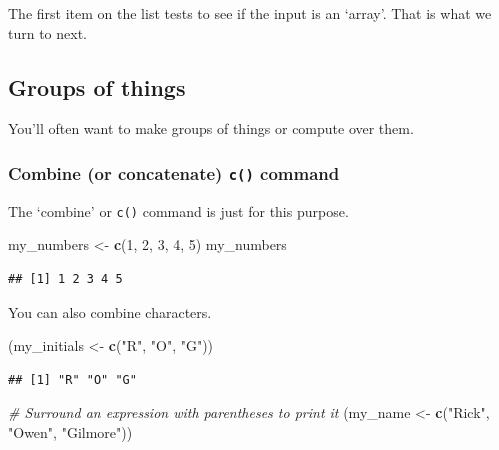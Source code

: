 \documentclass[]{article}
\newenvironment{Shaded}{\begin{snugshade}}{\end{snugshade}}
\newcommand{\KeywordTok}[1]{\textcolor[rgb]{0.13,0.29,0.53}{\textbf{#1}}}
\newcommand{\DecValTok}[1]{\textcolor[rgb]{0.00,0.00,0.81}{#1}}
\newcommand{\StringTok}[1]{\textcolor[rgb]{0.31,0.60,0.02}{#1}}
\newcommand{\CommentTok}[1]{\textcolor[rgb]{0.56,0.35,0.01}{\textit{#1}}}
\newcommand{\NormalTok}[1]{#1}
\begin{document}
The first item on the list tests to see if the input is an `array'. That
is what we turn to next.

\subsection{Groups of things}\label{groups-of-things}

You'll often want to make groups of things or compute over them.

\subsubsection{\texorpdfstring{Combine (or concatenate) \texttt{c()}
command}{Combine (or concatenate) c() command}}\label{combine-or-concatenate-c-command}

The `combine' or \texttt{c()} command is just for this purpose.

\begin{Shaded}
\begin{Highlighting}[]
\NormalTok{my_numbers <-}\StringTok{ }\KeywordTok{c}\NormalTok{(}\DecValTok{1}\NormalTok{, }\DecValTok{2}\NormalTok{, }\DecValTok{3}\NormalTok{, }\DecValTok{4}\NormalTok{, }\DecValTok{5}\NormalTok{)}
\NormalTok{my_numbers}
\end{Highlighting}
\end{Shaded}

\begin{verbatim}
## [1] 1 2 3 4 5
\end{verbatim}

You can also combine characters.

\begin{Shaded}
\begin{Highlighting}[]
\NormalTok{(my_initials <-}\StringTok{ }\KeywordTok{c}\NormalTok{(}\StringTok{"R"}\NormalTok{, }\StringTok{"O"}\NormalTok{, }\StringTok{"G"}\NormalTok{))}
\end{Highlighting}
\end{Shaded}

\begin{verbatim}
## [1] "R" "O" "G"
\end{verbatim}

\begin{Shaded}
\begin{Highlighting}[]
\CommentTok{# Surround an expression with parentheses to print it}
\NormalTok{(my_name <-}\StringTok{ }\KeywordTok{c}\NormalTok{(}\StringTok{"Rick"}\NormalTok{, }\StringTok{"Owen"}\NormalTok{, }\StringTok{"Gilmore"}\NormalTok{))}
\end{Highlighting}
\end{Shaded}
\end{document}
